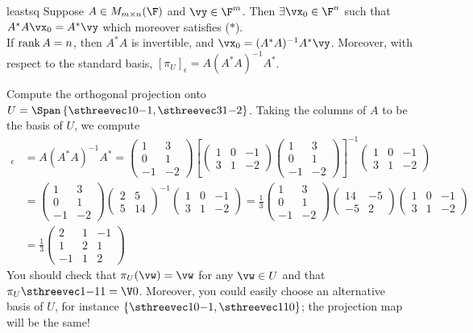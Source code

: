 \begin{thm}{}{leastsq}
Suppose $A\in M_{m\times n}(\F)$ and $\vy\in\F^m$. Then $\exists \vx_0\in\F^n$ such that $A^*A\vx_0=A^*\vy$ which moreover satisfies ($\ast$).\\
If $\operatorname{rank} A=n$, then $A^*A$ is invertible, and $\vx_0=(A^*A)^{-1}A^*\vy$. Moreover, with respect to the standard basis, $[\pi_U]_\epsilon=A(A^*A)^{-1}A^*$.
\end{thm}

\begin{example}{}{}
Compute the orthogonal projection onto $U=\Span\left\{\sthreevec 10{-1},\sthreevec 31{-2}\right\}$. Taking the columns of $A$ to be the basis of $U$, we compute
\begin{align*}
[\pi_U]_\epsilon &=A(A^*A)^{-1}A^* =
\begin{pmatrix}
1&3\\
0&1\\
-1&-2
\end{pmatrix}
\left[
\begin{pmatrix}
1&0&-1\\
3&1&-2
\end{pmatrix}\begin{pmatrix}
1&3\\
0&1\\
-1&-2
\end{pmatrix}
\right]^{-1}
\begin{pmatrix}
1&0&-1\\
3&1&-2
\end{pmatrix}\\
&=\begin{pmatrix}
1&3\\
0&1\\
-1&-2
\end{pmatrix}
\begin{pmatrix}
2&5\\
5&14
\end{pmatrix}^{-1}
\begin{pmatrix}
1&0&-1\\
3&1&-2
\end{pmatrix}
=\frac 13
\begin{pmatrix}
1&3\\
0&1\\
-1&-2
\end{pmatrix}
\begin{pmatrix}
14&-5\\
-5&2
\end{pmatrix}
\begin{pmatrix}
1&0&-1\\
3&1&-2
\end{pmatrix}\\
&=\frac 13\begin{pmatrix}
2&1&-1\\
1&2&1\\
-1&1&2
\end{pmatrix}
\end{align*}
You should check that $\pi_U(\vw)=\vw$ for any $\vw\in U$ and that $\pi_U\sthreevec 1{-1}1=\V0$. Moreover, you could easily choose an alternative basis of $U$, for instance $\left\{\sthreevec 10{-1},\sthreevec 110\right\}$; the projection map will be the same!
\end{example}

